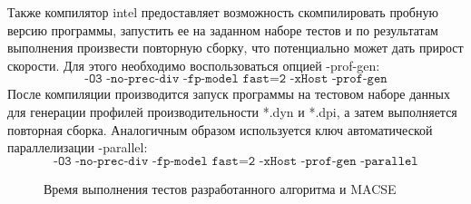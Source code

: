 Также компилятор intel предоставляет возможность скомпилировать пробную версию программы, запустить ее на заданном наборе тестов и по результатам выполнения произвести повторную сборку, что потенциально может дать прирост скорости. Для этого необходимо воспользоваться опцией -prof-gen:
\begin{equation*}
\texttt{-O3 -no-prec-div -fp-model fast=2 -xHost -prof-gen}
\end{equation*}
После компиляции производится запуск программы на тестовом наборе данных для генерации профилей производительности *.dyn и *.dpi, а затем выполняется повторная сборка. Аналогичным образом используется ключ автоматической параллелизации -parallel:
\begin{equation*}
\texttt{-O3 -no-prec-div -fp-model fast=2 -xHost -prof-gen -parallel}
\end{equation*}  

\begin{landscape}
\begin{figure}[h]
	\caption{Время выполнения тестов разработанного алгоритма и MACSE}
	\label{ris:gist}
\end{figure}
\end{landscape}

